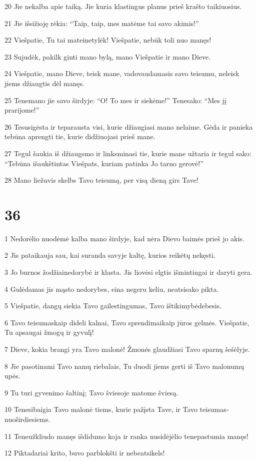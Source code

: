 \par 20 Jie nekalba apie taiką. Jie kuria klastingus planus prieš krašto taikiuosius. 
\par 21 Jie išsižioję rėkia: “Taip, taip, mes matėme tai savo akimis!” 
\par 22 Viešpatie, Tu tai matei­netylėk! Viešpatie, nebūk toli nuo manęs! 
\par 23 Sujudėk, pakilk ginti mano bylą, mano Viešpatie ir mano Dieve. 
\par 24 Viešpatie, mano Dieve, teisk mane, vadovaudamasis savo teisumu, neleisk jiems džiaugtis dėl manęs. 
\par 25 Tenemano jie savo širdyje: “O! To mes ir siekėme!” Tenesako: “Mes jį prarijome!” 
\par 26 Tesusigėsta ir teparausta visi, kurie džiaugiasi mano nelaime. Gėda ir panieka tebūna aprengti tie, kurie didžiuojasi prieš mane. 
\par 27 Tegul šaukia iš džiaugsmo ir linksminasi tie, kurie mane užtaria ir tegul sako: “Tebūna išaukštintas Viešpats, kuriam patinka Jo tarno gerovė!” 
\par 28 Mano liežuvis skelbs Tavo teisumą, per visą dieną girs Tave!



\chapter{36}


\par 1 Nedorėlio nuodėmė kalba mano širdyje, kad nėra Dievo baimės prieš jo akis. 
\par 2 Jis pataikauja sau, kai suranda savyje kaltę, kurios reikėtų nekęsti. 
\par 3 Jo burnos žodžiai­nedorybė ir klasta. Jis liovėsi elgtis išmintingai ir daryti gera. 
\par 4 Gulėdamas jis mąsto nedorybes, eina negeru keliu, neatsisako pikta. 
\par 5 Viešpatie, dangų siekia Tavo gailestingumas, Tavo ištikimybė­debesis. 
\par 6 Tavo teisumas­kaip dideli kalnai, Tavo sprendimai­kaip jūros gelmės. Viešpatie, Tu apsaugai žmogų ir gyvulį! 
\par 7 Dieve, kokia brangi yra Tavo malonė! Žmonės glaudžiasi Tavo sparnų šešėlyje. 
\par 8 Jie pasotinami Tavo namų riebalais, Tu duodi jiems gerti iš Tavo malonumų upės. 
\par 9 Tu turi gyvenimo šaltinį; Tavo šviesoje matome šviesą. 
\par 10 Tenesibaigia Tavo malonė tiems, kurie pažįsta Tave, ir Tavo teisumas­nuoširdiesiems. 
\par 11 Teneužkliudo manęs išdidumo koja ir ranka nusidėjėlio tenepastumia manęs! 
\par 12 Piktadariai krito, buvo parblokšti ir nebeatsikels!



